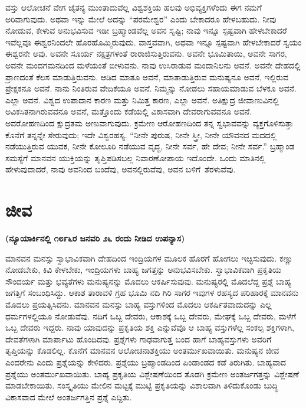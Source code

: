 \vskip 0.3cm

ವಸ್ತು ಆಲೋಚನೆ ವೇಗ ಚೈತನ್ಯ ಮುಂತಾದುವೆಲ್ಲ ವಿಶ್ವಶಕ್ತಿಯ ಹಲವು ಅಭಿವ್ಯಕ್ತಿಗಳೆಂದು ಈಗ ನಮಗೆ ಅರಿವಾಗುವುದು. ಅಥವಾ ಇನ್ನು ಮೇಲೆ ಅದನ್ನು “ಪರಮೇಶ್ವರ” ಎಂದು ಬೇಕಾದರೂ ಹೇಳಬಹುದು. ನೀವು ನೋಡುವ, ಕೇಳುವ ಅನುಭವಿಸುವ ಇಡೀ ಬ್ರಹ್ಮಾಂಡವೆಲ್ಲ ಅವನ ಸೃಷ್ಟಿ; ನಾವು ಇನ್ನೂ ಸ್ಪಷ್ಟವಾಗಿ ಹೇಳಬೇಕಾದರೆ ಇವೆಲ್ಲವೂ ಈಶ್ವರನಿಂದಲೇ ಹೊರಹೊಮ್ಮಿರುವುದು. ವಾಸ್ತವವಾಗಿ, ಅಥವಾ ಇನ್ನೂ ಸ್ಪಷ್ಟವಾಗಿ ಹೇಳಬೇಕಾದರೆ ಸ್ವಯಂ ಈಶ್ವರನೇ ಅವು. ಅವನೇ ಸೂರ್ಯ ನಕ್ಷತ್ರಗಳಂತೆ ರಾರಾಜಿಸುತ್ತಿರುವನು. ಅವನೇ ಭೂಮಿತಾಯಿ, ಅವನೇ ಸಾಗರ, ಅವನೇ ಮಂದಗಮನದಿಂದ ಮಳೆಯಂತೆ ಬೀಳುವನು. ನಾವು ಉಸಿರಾಡುವ ಮಂದಾನಿಲನು ಅವನೆ. ಅವನೇ ದೇಹದಲ್ಲಿ ಪ್ರಾಣದಂತೆ ಕೆಲಸ ಮಾಡುತ್ತಿರುವನು. ಆಡಿದ ಮಾತೂ ಅವನೆ, ಮಾತಾಡುತ್ತಿರುವ ಮನುಷ್ಯನೂ ಅವನೆ, ಇಲ್ಲಿರುವ ಪ್ರೇಕ್ಷಕನೂ ಅವನೆ. ನಾನು ನಿಂತಿರುವ ವೇದಿಕೆಯೂ ಅವನೆ. ನಿಮ್ಮನ್ನು ನೋಡಲು ಸಹಾಯಮಾಡುವ ಬೆಳಕೂ ಅವನೆ. ಎಲ್ಲಾ ಅವನೆ. ವಿಶ್ವದ ಉಪಾದಾನ ಕಾರಣ ಮತ್ತು ನಿಮಿತ್ತ ಕಾರಣ, ಎಲ್ಲಾ ಅವನೆ. ಅತಿಕ್ಷುದ್ರ ಜೀವಾಣುವಿನಲ್ಲಿ ಅವಿಕಸಿತನಾಗಿರುವವನೂ ಅವನೆ, ಮತ್ತೊಂದು ಕಡೆಯಲ್ಲಿ ವಿಕಾಸವಾಗಿ ದೇವರಾಗುವವನೂ ಅವನೆ. ಅವರೋಹಣದಿಂದ ಕ್ಷುದ್ರತಮ ಅಣುವಾಗುವುದು. ಕ್ರಮೇಣ ಆರೋಹಣದಿಂದ ತನ್ನ ಸ್ವಭಾವವನ್ನು ವ್ಯಕ್ತಗೊಳಿಸುತ್ತಾ ಕೊನೆಗೆ ತನ್ನನ್ನೇ ಸೇರುವುದು; ಇದೇ ವಿಶ್ವರಹಸ್ಯ. “ನೀನೇ ಪುರುಷ, ನೀನೇ ಸ್ತ್ರೀ, ನೀನೇ ಯೌವನದ ಮದದಲ್ಲಿ ನಡೆಯುತ್ತಿರುವ ಯುವಕ, ನೀನೇ ಕೋಲೂರಿ ನಡೆಯುವ ವೃದ್ಧ, ನೀನೇ ಸರ್ವ, ಹೇ ದೇವ; ನೀನೇ ಸರ್ವ.” ಬ್ರಹ್ಮಾಂಡ ಸಮಸ್ಯೆಗೆ ಮಾನವನ ಯುಕ್ತಿಯನ್ನು ತೃಪ್ತಿಪಡಿಸಬಲ್ಲ ನಿವಾರಣೋಪಾಯ ಇದೊಂದೇ. ಒಂದು ಮಾತಿನಲ್ಲಿ ಹೇಳುವುದಾದರೆ, ನಾವು ಅವನಿಂದ ಬಂದೆವು, ಅವನಲ್ಲಿರುವೆವು, ಅವನ ಬಳಿಗೆ\break\ ತೆರಳುವೆವು.


\chapter{ಜೀವ}%

\centerline{\textbf{(ನ್ಯೂಯಾರ್ಕಿನಲ್ಲಿ ೧೮೯೬ರ ಜನವರಿ ೨೬ ರಂದು ನೀಡಿದ ಉಪನ್ಯಾಸ)}}

ಮಾನವನ ಮನಸ್ಸು ಸ್ವಾಭಾವಿಕವಾಗಿ ದೇಹದಿಂದ ಇಂದ್ರಿಯಗಳ ಮೂಲಕ ಹೊರಗೆ ಹೋಗಲು ಇಚ್ಛಿಸುವುದು. ಕಣ್ಣು ನೋಡಬೇಕು, ಕಿವಿ ಕೇಳಬೇಕು, ಇಂದ್ರಿಯಗಳು ಬಾಹ್ಯ ಜಗತ್ತನ್ನು ಅನುಭವಿಸಬೇಕು. ಸ್ವಾಭಾವಿಕವಾಗಿ ಪ್ರಕೃತಿಯ ಸೌಂದರ್ಯ ಮತ್ತು ಭವ್ಯತೆಗಳು ಮನುಷ್ಯನನ್ನು ಮೊದಲು ಆಕರ್ಷಿಸುವುವು. ಮನುಷ್ಯರಲ್ಲಿ ಮೊದಲೆದ್ದ ಪ್ರಶ್ನೆ ಬಾಹ್ಯ ಜಗತ್ತಿಗೆ ಸಂಬಂಧಿಸಿದ್ದು. ಆಕಾಶ ತಾರಾವಳಿ ಗ್ರಹ ಭೂಮಿ ನದಿ ಗಿರಿ ಸಾಗರ ಇವುಗಳ ರಹಸ್ಯದ ಪರಿಹಾರಕ್ಕೆ ಮಾನವನು ಮೊದಲು ಪ್ರಯತ್ನಿಸಿದನು. ಮಾನವನ ಮನಸ್ಸು ಬಾಹ್ಯ ವಸ್ತುಗಳಿಂದ ಮೊದಲು ಆಕರ್ಷಿತವಾದುದನ್ನು ಎಲ್ಲ ಧರ್ಮಗಳಲ್ಲಿಯೂ ನೋಡುವೆವು. ನದಿಗೆ ಒಬ್ಬ ದೇವರು, ಆಕಾಶಕ್ಕೆ ಒಬ್ಬ ದೇವರು, ಮೇಘಕ್ಕೆ ಒಬ್ಬ ದೇವರು, ಮಳೆಗೆ ಒಬ್ಬ ದೇವರು ಇದ್ದರು. ನಾವು ಯಾವುದನ್ನು ಪ್ರಕೃತಿಯ ಶಕ್ತಿ ಎನ್ನುವೆವೊ ಆ ಬಾಹ್ಯ ವಸ್ತುಗಳೆಲ್ಲ ಸಂಕಲ್ಪ ಶಕ್ತಿಗಳಾಗಿ, ದೇವತೆಗಳಾಗಿ ಮಾರ್ಪಾಟು ಹೊಂದಿದವು. ಪ್ರಶ್ನೆಗಳು ಗಾಢವಾಗುತ್ತ ಬಂದ ಹಾಗೆ ಬಾಹ್ಯವಸ್ತುಗಳು ಅವರಿಗೆ ತೃಪ್ತಿಯನ್ನು ಕೊಡಲಿಲ್ಲ. ಕೊನೆಗೆ ಮಾನವನ ಆಲೋಚನಾಶಕ್ತಿಯು ಅಂತರ್ಮುಖವಾಯಿತು. ಮನುಷ್ಯನ ಜೀವ ಎಂದರೇನು ಎಂದು ಪ್ರಶ್ನೆಯನ್ನು ಕೇಳಿದರು. ಪ್ರಶ್ನೆಯು ಬ್ರಹ್ಮಾಂಡದಿಂದ ಪಿಂಡಾಂಡದ ಕಡೆ ತಿರುಗಿತು. ಬಾಹ್ಯವಾದ ಪ್ರಶ್ನೆಯು ಅಂತರ್ಮುಖವಾಯಿತು. ಬಾಹ್ಯ ಪ್ರಕೃತಿಯ ವಿಶ್ಲೇಷಣೆಯಿಂದ ತೊಡಗಿ ಕ್ರಮೇಣ ಅಂತರ್ಜಗತ್ತನ್ನು ವಿಶ್ಲೇಷಣೆ ಮಾಡಬೇಕಾಯಿತು. ಸಂಸ್ಕೃತಿಯು ಮೇಲಿನ ಮಟ್ಟಕ್ಕೆ ಮುಟ್ಟಿ ಪ್ರಕೃತಿಯನ್ನು ವಿಶಾಲವಾಗಿ ತಿಳಿದುಕೊಂಡು ಬುದ್ಧಿ ವಿಕಾಸವಾದ ಮೇಲೆ ಅಂತರ್ಜಗತ್ತಿನ ಪ್ರಶ್ನೆ ಎದ್ದಿತು.

